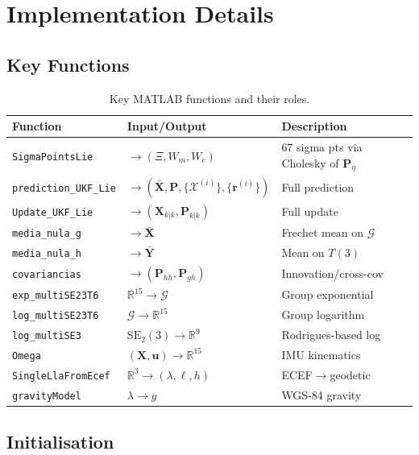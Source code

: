 \documentclass[11pt,a4paper]{article}
\theoremstyle{definition}
\theoremstyle{plain}
\newcommand{\bX}{\mathbf{X}}
\newcommand{\bP}{\mathbf{P}}
\begin{document}
\section{Implementation Details}

\subsection{Key Functions}

\begin{table}[h!]
\centering
\caption{Key MATLAB functions and their roles.}
\label{tab:functions}
\renewcommand{\arraystretch}{1.35}
\begin{tabular}{@{}llp{5.5cm}@{}}
\toprule
Function & Input/Output & Description \\
\midrule
\texttt{SigmaPointsLie} & $\to(\Xi,W_m,W_c)$ & 67 sigma pts via Cholesky of $\mathbf{P}_\eta$ \\
\texttt{prediction\_UKF\_Lie} & $\to(\bar{\mathbf{X}},\bP,\{\mathcal{X}^{(i)}\},\{\mathbf{r}^{(i)}\})$ & Full prediction \\
\texttt{Update\_UKF\_Lie} & $\to(\bX_{k|k},\bP_{k|k})$ & Full update \\
\texttt{media\_nula\_g} & $\to\bar{\mathbf{X}}$ & Frechet mean on $\mathcal{G}$ \\
\texttt{media\_nula\_h} & $\to\bar{\mathbf{Y}}$ & Mean on $T(3)$ \\
\texttt{covariancias} & $\to(\mathbf{P}_{hh},\mathbf{P}_{gh})$ & Innovation/cross-cov \\
\texttt{exp\_multiSE23T6} & $\mathbb{R}^{15}\to\mathcal{G}$ & Group exponential \\
\texttt{log\_multiSE23T6} & $\mathcal{G}\to\mathbb{R}^{15}$ & Group logarithm \\
\texttt{log\_multiSE3} & $\mathrm{SE}_2(3)\to\mathbb{R}^9$ & Rodrigues-based log \\
\texttt{Omega} & $(\bX,\mathbf{u})\to\mathbb{R}^{15}$ & IMU kinematics \\
\texttt{SingleLlaFromEcef} & $\mathbb{R}^3\to(\lambda,\ell,h)$ & ECEF$\to$geodetic \\
\texttt{gravityModel} & $\lambda\to g$ & WGS-84 gravity \\
\bottomrule
\end{tabular}
\end{table}

\subsection{Initialisation}
\end{document}
